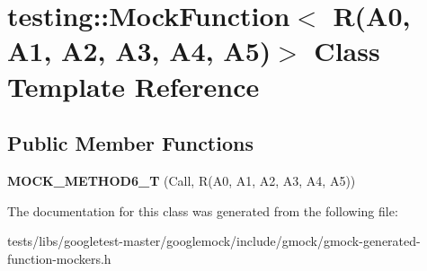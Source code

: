 \hypertarget{classtesting_1_1MockFunction_3_01R_07A0_00_01A1_00_01A2_00_01A3_00_01A4_00_01A5_08_4}{}\section{testing\+:\+:Mock\+Function$<$ R(A0, A1, A2, A3, A4, A5)$>$ Class Template Reference}
\label{classtesting_1_1MockFunction_3_01R_07A0_00_01A1_00_01A2_00_01A3_00_01A4_00_01A5_08_4}
\subsection*{Public Member Functions}
\begin{DoxyCompactItemize}
\item 
\mbox{\label{classtesting_1_1MockFunction_3_01R_07A0_00_01A1_00_01A2_00_01A3_00_01A4_00_01A5_08_4_ae66d20991ea3ab7d2b817c54df80653e}} 
{\bfseries M\+O\+C\+K\+\_\+\+M\+E\+T\+H\+O\+D6\+\_\+T} (Call, R(A0, A1, A2, A3, A4, A5))
\end{DoxyCompactItemize}


The documentation for this class was generated from the following file\+:\begin{DoxyCompactItemize}
\item 
tests/libs/googletest-\/master/googlemock/include/gmock/gmock-\/generated-\/function-\/mockers.\+h\end{DoxyCompactItemize}
